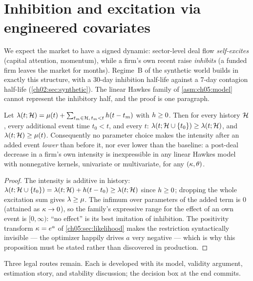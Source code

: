 \section{Inhibition and excitation via engineered
covariates}\label{ch05:sec:inhibition}

We expect the market to have a signed dynamic: sector-level deal flow
\emph{self-excites} (capital attention, momentum), while a firm's own
recent raise \emph{inhibits} (a funded firm leaves the market for
months). Regime~B of the synthetic world builds in exactly this
structure, with a 30-day inhibition half-life against a 7-day contagion
half-life (\cref{ch02:sec:synthetic}). The linear Hawkes family of
\cref{asm:ch05:model} cannot represent the inhibitory half, and the proof
is one paragraph.

\begin{proposition}\label{prop:ch05:monotone}
Let $\lambda(t; \mathcal{H}) = \mu(t) + \sum_{t_m \in \mathcal{H},\, t_m < t}
h(t - t_m)$ with $h \ge 0$. Then for every history $\mathcal{H}$,
every additional event time $t_0 < t$, and every $t$:
$\lambda(t; \mathcal{H} \cup \{t_0\}) \ge \lambda(t; \mathcal{H})$, and $\lambda(t;\mathcal{H}) \ge
\mu(t)$. Consequently no parameter choice makes the intensity after an
added event \emph{lower} than before it, nor ever lower than the
baseline: a post-deal decrease in a firm's own intensity is inexpressible
in any linear Hawkes model with nonnegative kernels, univariate or
multivariate, for any $(\kappa, \theta)$.
\end{proposition}

\begin{proof}
The intensity is additive in history: $\lambda(t; \mathcal{H}\cup\{t_0\}) =
\lambda(t;\mathcal{H}) + h(t - t_0) \ge \lambda(t;\mathcal{H})$ since $h \ge
0$; dropping the whole excitation sum gives $\lambda \ge \mu$. The infimum
over parameters of the added term is $0$ (attained as $\kappa \to 0$),
so the family's expressive range for the effect of an own event is
$[0, \infty)$: ``no effect'' is its best imitation of inhibition. The
positivity transform $\kappa = e^{a}$ of
\cref{ch05:sec:likelihood} makes the restriction syntactically invisible
--- the optimizer happily drives $a$ very negative --- which is why this
proposition must be stated rather than discovered in production.
\end{proof}

Three legal routes remain. Each is developed with its model, validity
argument, estimation story, and stability discussion; the decision box at
the end commits.

